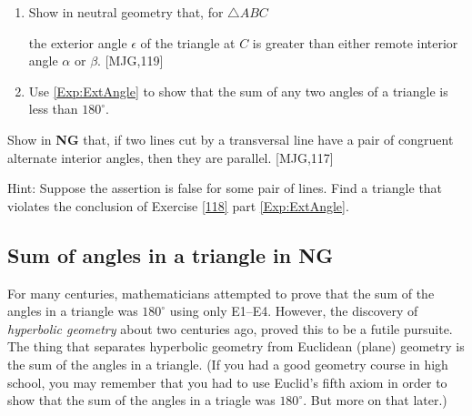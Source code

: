 \begin{question}
\label{118} 
\begin{enumerate}
\item\label{Exp:ExtAngle} Show in neutral geometry that, for $\triangle ABC$
\begin{image}
\end{image}
the exterior angle $\epsilon$ of the triangle at $C$ is greater than either remote interior angle $\alpha$ or $\beta$. [MJG,119]
\item Use \ref{Exp:ExtAngle} to show that the sum of any two angles of a triangle is less than $180^{\circ}$.
\end{enumerate}
\end{question}

\begin{exploration}
Show in \textbf{NG} that, if two lines cut by a transversal line have
a pair of congruent alternate interior angles, then they are
parallel. [MJG,117]

Hint: Suppose the assertion is false for some pair of lines. Find a
triangle that violates the conclusion of Exercise \ref{118}
part \ref{Exp:ExtAngle}.
\end{exploration}












\subsection*{Sum of angles in a triangle in NG}


For many centuries, mathematicians attempted to prove that the sum of
the angles in a triangle was $180^{\circ}$ using only E1--E4. However,
the discovery of \textit{hyperbolic geometry} about two centuries ago,
proved this to be a futile pursuite. The thing that separates
hyperbolic geometry from Euclidean (plane) geometry is the sum of
the angles in a triangle. (If you had a good geometry course in high
school, you may remember that you had to use Euclid's fifth axiom in
order to show that the sum of the angles in a triagle was
$180^{\circ}.$ But more on that later.)

